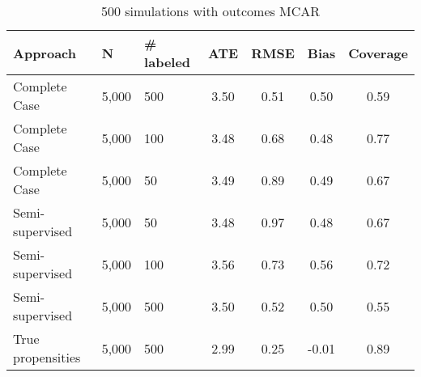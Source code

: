 \begin{table}[ht]
\centering
\begingroup\small
\begin{tabular}{lllcc>{\columncolor[gray]{.9}}c>{\columncolor[gray]{.9}}c}
  \hline
Approach & N & \# labeled & ATE & RMSE & Bias & Coverage \\ 
  \hline
  Complete Case & 5,000 & 500 & 3.50 & 0.51 & 0.50 & 0.59 \\ 
  Complete Case & 5,000 & 100 & 3.48 & 0.68 & 0.48 & 0.77 \\ 
  Complete Case & 5,000 &  50 & 3.49 & 0.89 & 0.49 & 0.67 \\ 
   \rowcolor[gray]{.8} Semi-supervised & 5,000 &  50 & 3.48 & 0.97 & 0.48 & 0.67 \\ 
   \rowcolor[gray]{.7} Semi-supervised & 5,000 & 100 & 3.56 & 0.73 & 0.56 & 0.72 \\ 
   \rowcolor[gray]{.6} Semi-supervised & 5,000 & 500 & 3.50 & 0.52 & 0.50 & 0.55 \\ 
   \rowcolor[gray]{.5} True propensities & 5,000 & 500 & 2.99 & 0.25 & -0.01 & 0.89 \\ 
   \hline
\end{tabular}
\endgroup
\caption{500 simulations with outcomes MCAR} 
\end{table}
